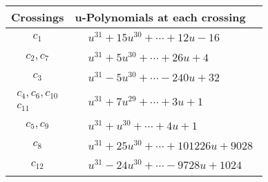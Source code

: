\documentclass[1p]{elsarticle_modified}
\theoremstyle{definition}
\begin{document}
\begin{tabular}{m{50pt}|m{274pt}}
Crossings & \hspace{64pt}u-Polynomials at each crossing \\
\hline $$\begin{aligned}c_{1}\end{aligned}$$&$\begin{aligned}
&u^{31}+15 u^{30}+\cdots+12 u-16
\end{aligned}$\\
\hline $$\begin{aligned}c_{2},c_{7}\end{aligned}$$&$\begin{aligned}
&u^{31}+5 u^{30}+\cdots+26 u+4
\end{aligned}$\\
\hline $$\begin{aligned}c_{3}\end{aligned}$$&$\begin{aligned}
&u^{31}-5 u^{30}+\cdots-240 u+32
\end{aligned}$\\
\hline $$\begin{aligned}c_{4},c_{6},c_{10}\\c_{11}\end{aligned}$$&$\begin{aligned}
&u^{31}+7 u^{29}+\cdots+3 u+1
\end{aligned}$\\
\hline $$\begin{aligned}c_{5},c_{9}\end{aligned}$$&$\begin{aligned}
&u^{31}+u^{30}+\cdots+4 u+1
\end{aligned}$\\
\hline $$\begin{aligned}c_{8}\end{aligned}$$&$\begin{aligned}
&u^{31}+25 u^{30}+\cdots+101226 u+9028
\end{aligned}$\\
\hline $$\begin{aligned}c_{12}\end{aligned}$$&$\begin{aligned}
&u^{31}-24 u^{30}+\cdots-9728 u+1024
\end{aligned}$\\
\hline
\end{tabular}\\~\\
\end{document}
